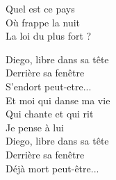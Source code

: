 \documentclass{novel}
\begin{document}
{\begin{minipage}[t][0.55\textheight][t]{\textwidth}
\begin{multicols}{2}
Quel est ce pays \\
Où frappe la nuit \\
La loi du plus fort ? \\

\columnbreak

Diego, libre dans sa tête \\
Derrière sa fenêtre \\
S'endort peut-etre... \\

Et moi qui danse ma vie \\
Qui chante et qui rit \\
Je pense à lui \\

Diego, libre dans sa tête \\
Derrière sa fenêtre \\
Déjà mort peut-être... \\
\end{multicols}
\end{minipage}
}
\end{document}
